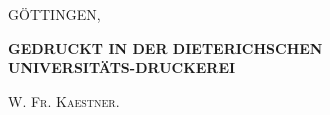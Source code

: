 \clearpage\fancyhead[L]{}

\vspace*{0.24\textheight}
\begin{center}
{\large GÖTTINGEN,}\par
\medskip
\textbf{GEDRUCKT IN DER DIETERICHSCHEN\\UNIVERSITÄTS-DRUCKEREI}\par
\smallskip
\textsc{W. Fr. Kaestner.}
\end{center}
\clearpage
\endgroup
